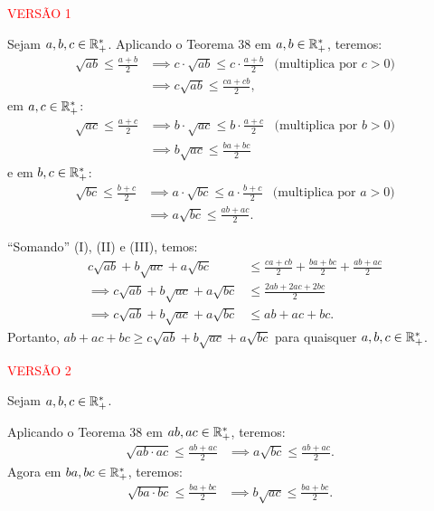 
\textcolor{red}{ VERSÃO 1 } %

Sejam $a, b, c \in \mathbb R_+^\ast$. Aplicando o Teorema 38 em $a, b \in \mathbb R_+^\ast $,
teremos:
\begin{align*}
  \sqrt{ab} \leq \frac{a+b}{2} & \implies c\cdot\sqrt{ab} \leq c\cdot\frac{a+b}{2} & \text{(multiplica por $c>0$)} \\
                               & \implies c\sqrt{ab} \leq \frac{ca+cb}{2}, \tag{I}
\end{align*}
em $a, c \in \mathbb R_+^\ast $:
\begin{align*}
  \sqrt{ac} \leq \frac{a+c}{2} & \implies b\cdot\sqrt{ac} \leq b\cdot\frac{a+c}{2}  & \text{(multiplica por $b>0$)} \\
                               & \implies b\sqrt{ac} \leq \frac{ba+bc}{2}  \tag{II}
\end{align*}
e em $b, c \in \mathbb R_+^\ast $:
\begin{align*}
  \sqrt{bc} \leq \frac{b+c}{2} & \implies a\cdot\sqrt{bc} \leq a\cdot\frac{b+c}{2}    & \text{(multiplica por $a>0$)} \\
                               & \implies a\sqrt{bc} \leq \frac{ab+ac}{2}.  \tag{III}
\end{align*}

``Somando'' (I), (II) e (III), temos:
\begin{align*}
  c\sqrt{ab} + b\sqrt{ac} + a\sqrt{bc}           & \leq \frac{ca+cb}{2} + \frac{ba+bc}{2} + \frac{ab+ac}{2} \\
  \implies c\sqrt{ab} + b\sqrt{ac} + a\sqrt{bc}  & \leq \frac{2ab+2ac+2bc}{2}                               \\
  \implies c \sqrt{ab} + b\sqrt{ac} + a\sqrt{bc} & \leq  ab + ac + bc.
\end{align*}
Portanto, $ ab + ac + bc \geq c\sqrt{ab} + b\sqrt{ac} + a\sqrt{bc}$ para quaisquer $a, b, c \in \mathbb R_+^\ast$.

\bigskip

\textcolor{red}{ VERSÃO 2} %

Sejam $a, b, c \in \mathbb R_+^\ast$.

Aplicando o Teorema 38 em $ab, ac \in \mathbb R_+^\ast$, teremos:
\begin{align*}
  \sqrt{ab\cdot ac} \leq \frac{ab+ac}{2} & \implies a\sqrt{bc} \leq \frac{ab+ac}{2}. & \tag{I}
\end{align*}
Agora em $ba, bc \in \mathbb R_+^\ast$, teremos:
\begin{align*}
  \sqrt{ba\cdot bc} \leq \frac{ba+bc}{2} & \implies b\sqrt{ac} \leq \frac{ba+bc}{2}. & \tag{II}
\end{align*}

